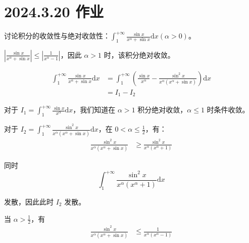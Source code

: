 \ifx\allfiles\undefined

\date{}
\author{尹锦润}

\maketitle
\fi

\section{2024.3.20 作业}

\begin{ques}
	讨论积分的收敛性与绝对收敛性：$\displaystyle \int _{1}^{+\infty }\frac{\sin x}{x^{\alpha } +\sin x}\mathrm{d} x( \alpha  >0)$。
\end{ques}



$\displaystyle \left| \frac{\sin x}{x^{\alpha } +\sin x}\right| \leqslant \left| \frac{1}{x^{\alpha } -1}\right| $，因此 $\displaystyle \alpha  >1$ 时，该积分绝对收敛。


\begin{align*}
	\int _{1}^{+\infty }\frac{\sin x}{x^{\alpha } +\sin x}\mathrm{d} x & =\int _{1}^{+\infty }\left(\frac{\sin x}{x^{\alpha }} -\frac{\sin^{2} x}{x^{\alpha }\left( x^{\alpha } +\sin x\right)}\right)\mathrm{d} x\\
	& =I_{1} -I_{2}
\end{align*}

对于 $\displaystyle I_{1} =\int _{1}^{+\infty }\frac{\sin x}{x^{\alpha }}\mathrm{d} x$，我们知道在 $\displaystyle \alpha  >1$ 积分绝对收敛，$\displaystyle \alpha \leqslant 1$ 时条件收敛。

对于 $\displaystyle I_{2} =\int _{1}^{+\infty }\frac{\sin^{2} x}{x^{\alpha }\left( x^{\alpha } +\sin x\right)}\mathrm{d} x$，在 $\displaystyle 0< \alpha \leqslant \frac{1}{2}$，有：
\begin{align*}
	\frac{\sin^{2} x}{x^{\alpha }\left( x^{\alpha } +\sin x\right)} & \geqslant \frac{\sin^{2} x}{x^{\alpha }\left( x^{\alpha } +1\right)}
\end{align*}


同时
\begin{equation*}
	\int _{1}^{+\infty }\frac{\sin^{2} x}{x^{\alpha }\left( x^{\alpha } +1\right)}\mathrm{d} x
\end{equation*}

发散，因此此时 $\displaystyle I_{2}$ 发散。

当 $\displaystyle \alpha  >\frac{1}{2}$，有
\begin{align*}
	\frac{\sin^{2} x}{x^{\alpha }\left( x^{\alpha } +\sin x\right)} & \leqslant \frac{1}{x^{\alpha }\left( x^{\alpha } -1\right)}
\end{align*}

